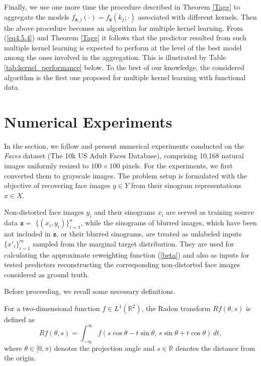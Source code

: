 \documentclass[twoside,11pt]{article}
\begin{document}
Finally, we use one more time the procedure described in Theorem \ref{Tagg} to aggregate the models $f_{\mathbf{z},j}(\cdot) = f_{\mathbf{z}}(k_j; \cdot)$  associated with different kernels. Then the above procedure becomes an algorithm for multiple kernel learning. From (\ref{eq4.5.4}) and Theorem \ref{Tagg} it follows that the predictor resulted from such multiple kernel learning is expected to perform at the level of the best model among the ones involved in the aggregation. This is illustrated by Table \ref{tab:kernel_performance} below. To the best of our knowledge, the considered algorithm is the first one proposed for multiple kernel learning with functional data.

\section{Numerical Experiments}\label{numerical experiments}

In the section, we follow \cite{aspri} and present numerical experiments conducted on the \textit{Faces} dataset \cite{bainbridge2013intrinsic} 
(The 10k US Adult Faces Database), comprising 10,168 natural images uniformly 
resized to $100 \times 100$ pixels. For the experiments, we first converted 
them to grayscale images. The problem setup is formulated with the objective 
of recovering face images $y \in Y$ from their sinogram representations $x \in X$. 

Non-distorted face images $y_i$ and their sinograms $x_i$ are served as training source data $\mathbf{z} =$ $\{(x_i, y_i)\}_{i=1}^n$, while the sinograms of blurred images, which have been not included in $\mathbf{z}$, or their blurred sinograms, are treated as unlabeled inputs $\{x'_i\}_{i=1}^m$ sampled from the marginal target distribution. They are used for calculating the approximate reweighting function (\ref{beta}) and also as inputs for tested predictors reconstructing the corresponding non-distorted face images considered as ground truth. 

Before proceeding, we recall some necessary definitions.

\begin{definition}
For a two-dimensional function $f \in L^1(\mathbb{R}^2)$, the Radon transform 
$R f(\theta, s)$ is defined as
\[
R f(\theta, s) = \int_{-\infty}^{\infty} f(s \cos \theta - t \sin \theta, 
\, s \sin \theta + t \cos \theta) \, dt,
\]
where $\theta \in [0, \pi)$ denotes the projection angle and $s \in \mathbb{R}$ 
denotes the distance from the origin.
\end{definition}
\end{document}
